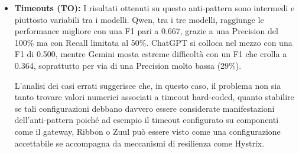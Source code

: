 \begin{itemize}
    Si precisa, infine, che è uno degli AP che ha beneficiato positivamente, durante i test preliminari, del cambio di definizione rendendo la detection più accurata, riducendo falsi positivi e falsi negativi. 

    \begin{tcolorbox}[
    title=\textbf{Indicatori tipici per escludere il No Health Check},
    colback=blue!3!white,
    colframe=blue!55!black,
    coltitle=white,
    fonttitle=\bfseries,
    enhanced,
    breakable,
    arc=2mm,
    boxrule=0.8pt
]

I modelli tendono a escludere l'anti-pattern quando trovano segnali espliciti di controllo dello stato dei servizi:

\vspace{2mm}

\begin{itemize}[leftmargin=*]
    \item endpoint come \texttt{/health}, \texttt{/actuator/health}, \texttt{/ready} o \texttt{/readiness};
    \item dipendenze come \texttt{spring-boot-starter-actuator};
    \item classi o interfacce come \texttt{HealthIndicator};
    \item \textit{liveness probe}, \textit{readiness probe} o \texttt{healthcheck} nei file di deployment.
\end{itemize}

\end{tcolorbox}

   \item \textbf{Timeouts (TO):} I risultati ottenuti su questo anti-pattern sono intermedi e piuttosto variabili tra i modelli. Qwen, tra i tre modelli, raggiunge le performance migliore con una F1 pari a 0.667, grazie a una Precision del 100\% ma con Recall limitata al 50\%. ChatGPT si colloca nel mezzo con una F1 di 0.500, mentre Gemini mosta estreme difficoltà con un F1 che crolla a 0.364, soprattutto per via di una Precision molto bassa (29\%).

    L’analisi  dei casi errati suggerisce che, in questo caso, il problema non sia tanto trovare valori numerici associati a timeout hard-coded, quanto stabilire se tali configurazioni debbano davvero essere considerate manifestazioni dell’anti-pattern poiché ad esempio il timeout configurato su componenti come il gateway, Ribbon o Zuul può essere visto come una configurazione accettabile se accompagna da meccanismi di resilienza come Hystrix.
    

\end{itemize}
